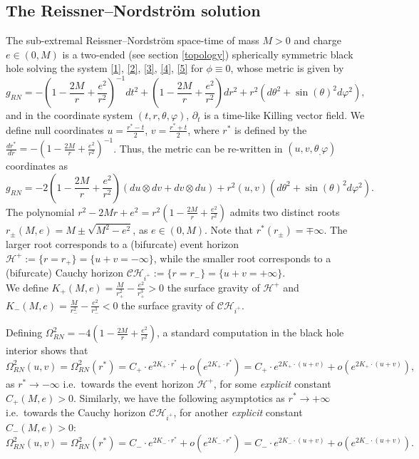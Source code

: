 \documentclass[10pt,a4paper]{article}
\theoremstyle{plain}
\theoremstyle{remark}
\theoremstyle{definition}
\theoremstyle{plain}
\theoremstyle{remark}
\theoremstyle{definition}
\newcommand{\CH}{\mathcal{CH}_{i^+}}
\numberwithin{equation}{section}
\begin{document}



\subsection{The Reissner--Nordstr\"{o}m solution} \label{RNsolution}

The sub-extremal Reissner--Nordstr\"{o}m space-time of mass $M>0$ and charge $ e \in (0,M)$ is a two-ended (see section \ref{topology}) spherically symmetric black hole solving the system \eqref{1}, \eqref{2}, \eqref{3}, \eqref{4}, \eqref{5} for $\phi \equiv 0$, whose metric is given by $$ g_{RN}= -(1-\frac{2M}{r} +\frac{e^2}{r^2})^{-1}  dt^2 + (1-\frac{2M}{r} +\frac{e^2}{r^2})  dr^2 + r^2 (d\theta^2+\sin(\theta)^2 d \varphi ^2),$$ and in the coordinate system $(t,r,\theta,\varphi)$, $\partial_t$ is a time-like Killing vector field. We define null coordinates $u= \frac{r^*-t}{2}$, $v=\frac{r^*+t}{2}$, where $r^*$ is defined by the $\frac{dr^*}{dr}= -(1-\frac{2M}{r} +\frac{e^2}{r^2})^{-1}$. Thus, the metric can be re-written in $(u,v,\theta_,\varphi)$ coordinates as
$$ g_{RN}= -2(1-\frac{2M}{r} +\frac{e^2}{r^2})  (du  \otimes dv+dv  \otimes du)+ r^2(u,v) (d\theta^2+\sin(\theta)^2 d \varphi ^2).$$
The polynomial $r^2-2Mr+e^2=r^2(1-\frac{2M}{r} +\frac{e^2}{r^2})$ admits two distinct roots $r_{\pm}(M,e)= M \pm \sqrt{M^2-e^2}$, as $e \in (0,M)$. Note that $r^*(r_{\pm})= \mp \infty$. The larger root corresponds to a (bifurcate) event horizon $\mathcal{H}^+:= \{ r=r_+\} = \{u+v = -\infty\}$, while the smaller root corresponds to a (bifurcate) Cauchy horizon  $\CH:= \{ r=r_-\} = \{u+v = +\infty\}$. \\ We define $K_{+}(M,e)= \frac{M}{r^2_+}- \frac{e^2}{r_+^3}>0$ the surface gravity of $\mathcal{H}^+$ and $K_{-}(M,e)= \frac{M}{r^2_-}- \frac{e^2}{r_-^3}<0$ the surface gravity of $\CH$.

Defining $\Omega^2_{RN} = -4 (1-\frac{2M}{r} +\frac{e^2}{r^2})$, a standard computation in the black hole interior shows that $$   \Omega^2_{RN}(u,v)=\Omega^2_{RN}(r^*) = C_+ \cdot e^{2K_+ \cdot r^*}+o( e^{2K_+ \cdot r^*})= C_+ \cdot e^{2K_+ \cdot (u+v)}+o(  e^{2K_+ \cdot (u+v)}),$$ as $r^* \rightarrow -\infty$ i.e.\ towards the event horizon $\mathcal{H}^+$, for some \textit{explicit} constant $C_+(M,e)>0$\color{black}. Similarly, we have the following asymptotics as $r^* \rightarrow +\infty$ i.e.\ towards the Cauchy horizon $\CH$, for another \textit{explicit} constant $C_-(M,e)>0$: $$   \Omega^2_{RN}(u,v)=\Omega^2_{RN}(r^*) = C_- \cdot e^{2K_- \cdot r^*}+o(e^{2K_- \cdot r^*})= C_- \cdot e^{2K_- \cdot (u+v)}+o( e^{2K_- \cdot (u+v)}).$$
\end{document}
